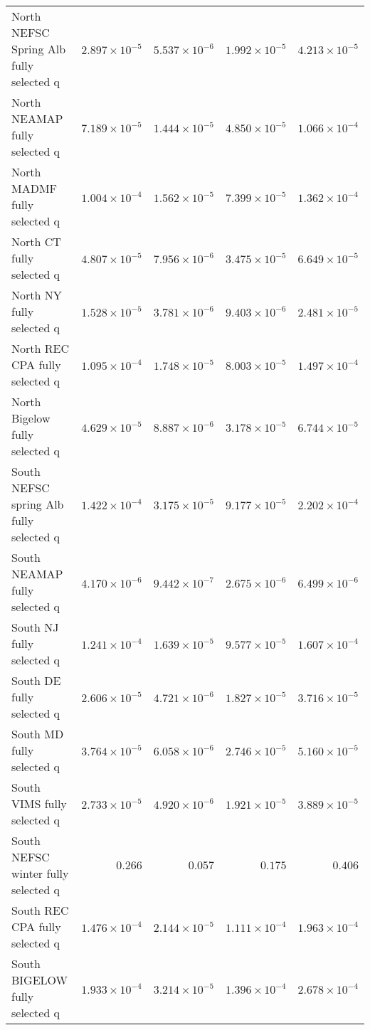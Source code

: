 \documentclass[
]{article}
\begin{document}
\begin{landscape}
\begin{longtable}[t]{lrrrr}
\addlinespace
North NEFSC Spring Alb fully selected q & $2.897\times 10^{-5}$ & $5.537\times 10^{-6}$ & $1.992\times 10^{-5}$ & $4.213\times 10^{-5}$\\
North NEAMAP fully selected q & $7.189\times 10^{-5}$ & $1.444\times 10^{-5}$ & $4.850\times 10^{-5}$ & $1.066\times 10^{-4}$\\
North MADMF fully selected q & $1.004\times 10^{-4}$ & $1.562\times 10^{-5}$ & $7.399\times 10^{-5}$ & $1.362\times 10^{-4}$\\
North CT fully selected q & $4.807\times 10^{-5}$ & $7.956\times 10^{-6}$ & $3.475\times 10^{-5}$ & $6.649\times 10^{-5}$\\
North NY fully selected q & $1.528\times 10^{-5}$ & $3.781\times 10^{-6}$ & $9.403\times 10^{-6}$ & $2.481\times 10^{-5}$\\
\addlinespace
North REC CPA fully selected q & $1.095\times 10^{-4}$ & $1.748\times 10^{-5}$ & $8.003\times 10^{-5}$ & $1.497\times 10^{-4}$\\
North Bigelow fully selected q & $4.629\times 10^{-5}$ & $8.887\times 10^{-6}$ & $3.178\times 10^{-5}$ & $6.744\times 10^{-5}$\\
South NEFSC spring Alb fully selected q & $1.422\times 10^{-4}$ & $3.175\times 10^{-5}$ & $9.177\times 10^{-5}$ & $2.202\times 10^{-4}$\\
South NEAMAP fully selected q & $4.170\times 10^{-6}$ & $9.442\times 10^{-7}$ & $2.675\times 10^{-6}$ & $6.499\times 10^{-6}$\\
South NJ fully selected q & $1.241\times 10^{-4}$ & $1.639\times 10^{-5}$ & $9.577\times 10^{-5}$ & $1.607\times 10^{-4}$\\
\addlinespace
South DE fully selected q & $2.606\times 10^{-5}$ & $4.721\times 10^{-6}$ & $1.827\times 10^{-5}$ & $3.716\times 10^{-5}$\\
South MD fully selected q & $3.764\times 10^{-5}$ & $6.058\times 10^{-6}$ & $2.746\times 10^{-5}$ & $5.160\times 10^{-5}$\\
South VIMS fully selected q & $2.733\times 10^{-5}$ & $4.920\times 10^{-6}$ & $1.921\times 10^{-5}$ & $3.889\times 10^{-5}$\\
South NEFSC winter fully selected q & $0.266$ & $0.057$ & $0.175$ & $0.406$\\
South REC CPA fully selected q & $1.476\times 10^{-4}$ & $2.144\times 10^{-5}$ & $1.111\times 10^{-4}$ & $1.963\times 10^{-4}$\\
\addlinespace
South BIGELOW fully selected q & $1.933\times 10^{-4}$ & $3.214\times 10^{-5}$ & $1.396\times 10^{-4}$ & $2.678\times 10^{-4}$\\

\end{longtable}
\end{landscape}
\end{document}
